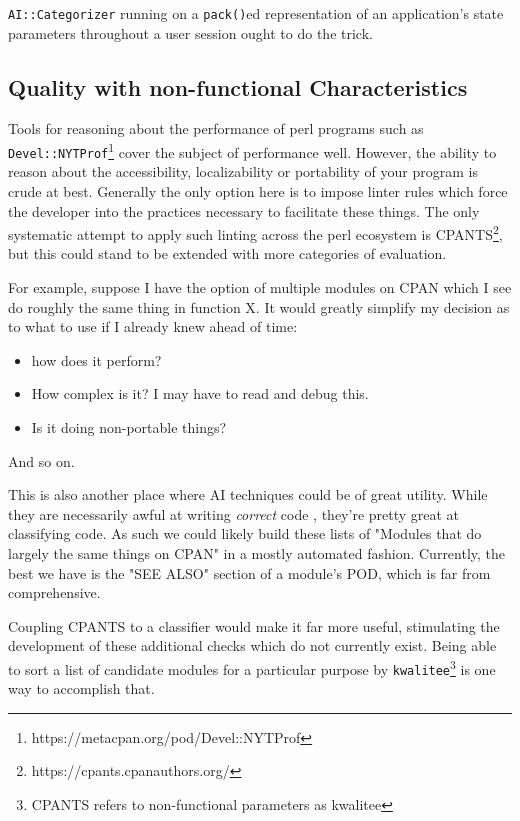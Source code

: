\documentclass{article}
\begin{document}
\texttt{AI::Categorizer} running on a \texttt{pack()}ed representation of an application's state parameters throughout a user session ought to do the trick.

\subsection{Quality with non-functional Characteristics}

Tools for reasoning about the performance of perl programs such as \texttt{Devel::NYTProf}\footnote{https://metacpan.org/pod/Devel::NYTProf} cover the subject of performance well.
However, the ability to reason about the accessibility, localizability or portability of your program is crude at best.
Generally the only option here is to impose linter rules which force the developer into the practices necessary to facilitate these things.
The only systematic attempt to apply such linting across the perl ecosystem is CPANTS\footnote{https://cpants.cpanauthors.org/},
but this could stand to be extended with more categories of evaluation.

For example, suppose I have the option of multiple modules on CPAN which I see do roughly the same thing in function X.
It would greatly simplify my decision as to what to use if I already knew ahead of time:
\begin{itemize}
\item how does it perform?
\item How complex is it?  I may have to read and debug this.
\item Is it doing non-portable things?
\end{itemize}
And so on.

This is also another place where AI techniques could be of great utility.
While they are necessarily awful at writing \textit{correct} code \cite{copilot}, they're pretty great at classifying code.
As such we could likely build these lists of "Modules that do largely the same things on CPAN" in a mostly automated fashion.
Currently, the best we have is the "SEE ALSO" section of a module's POD, which is far from comprehensive.

Coupling CPANTS to a classifier would make it far more useful, stimulating the development of these additional checks which do not currently exist.
Being able to sort a list of candidate modules for a particular purpose by \texttt{kwalitee}\footnote{CPANTS refers to non-functional parameters as kwalitee}
is one way to accomplish that.
\end{document}
